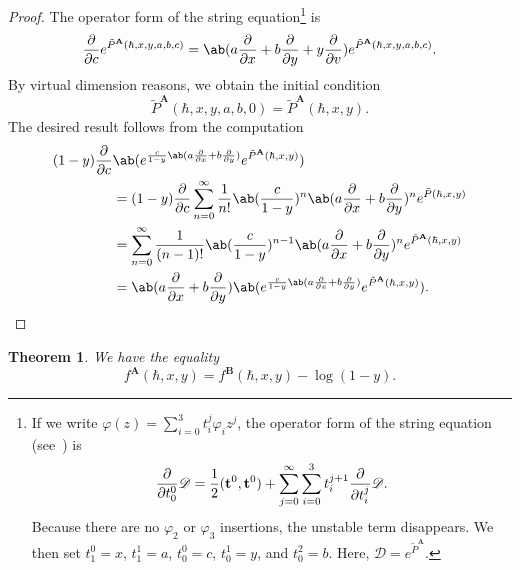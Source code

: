 \documentclass[10pt]{amsart}
\newtheorem{thm}{Theorem}[section]
\theoremstyle{definition}
\theoremstyle{remark}
\theoremstyle{plain}
\theoremstyle{definition}
\theoremstyle{remark}
\newcommand{\bA}{\mathbf{A}}
\newcommand{\bB}{\mathbf{B}}
\newcommand{\bt}{\mathbf{t}}
\newcommand{\msc}[1]{\mathscr{#1}}
\newcommand{\1}{\mathbf{1}}
\newcommand{\2}{\mathbf{2}}
\newcommand{\3}{\mathbf{3}}
\numberwithin{equation}{section}
\begin{document}
\begin{proof}
    The operator form of the string equation\footnote{If we write $\varphi(z) = \sum_{i=0}^3 t_i^j \varphi_i z^j$, the operator form of the string equation (see~\cite{symplfrob}) is
    \[ \pdv{}{t_0^0} \msc{D} = \frac{1}{2} (\bt^0, \bt^0) + \sum_{j=0}^{\infty} \sum_{i=0}^3 t_i^{j+1} \pdv{}{t_i^j} \msc{D}. \]
    Because there are no $\varphi_2$ or $\varphi_3$ insertions, the unstable term disappears. We then set $t_1^0 = x$, $t_1^1 = a$, $t_0^0 = c$, $t_0^1 = y$, and $t_0^2 = b$. Here, $\msc{D} = e^{\tilde{P}^{\bA}}$.} is
    \[ \pdv{}{c} e^{\tilde{P}^{\bA}(\hbar, x, y, a, b, c)} = \ab(a \pdv{}{x} + b \pdv{}{y} + y\pdv{}{v})e^{\tilde{P}^{\bA}(\hbar, x, y, a, b, c)}. \]
    By virtual dimension reasons, we obtain the initial condition
    \[ \tilde{P}^{\bA}(\hbar, x, y, a, b, 0) = \tilde{P}^{\bA}(\hbar, x, y). \]
    The desired result follows from the computation
    \begin{align*}
        (1-y)\pdv{}{c}&\ab( e^{\frac{c}{1-y}\ab(a \pdv{}{x} + b \pdv{}{y})} e^{\tilde{P}^{\bA}(\hbar, x, y)} ) \\
        &= (1-y)\pdv{}{c} \sum_{n=0}^{\infty} \frac{1}{n!} \ab(\frac{c}{1-y})^n \ab(a \pdv{}{x} + b \pdv{}{y})^n e^{\tilde{P}(\hbar, x, y)} \\
        &= \sum_{n=0}^{\infty} \frac{1}{(n-1)!} \ab(\frac{c}{1-y})^{n-1} \ab(a \pdv{}{x} + b \pdv{}{y})^n e^{\tilde{P}^{\bA}(\hbar, x, y)} \\
        &= \ab(a \pdv{}{x} + b\pdv{}{y}) \ab(e^{\frac{c}{1-y}\ab(a \pdv{}{x} + b \pdv{}{y})} e^{\tilde{P}^{\bA}(\hbar, x, y)}). \qedhere
    \end{align*}
\end{proof}

\begin{thm}\label{thm:allgenusmirror}
    We have the equality
    \[ f^{\bA}(\hbar, x, y) = f^{\bB}(\hbar, x, y) - \log(1-y). \]
\end{thm}
\end{document}
